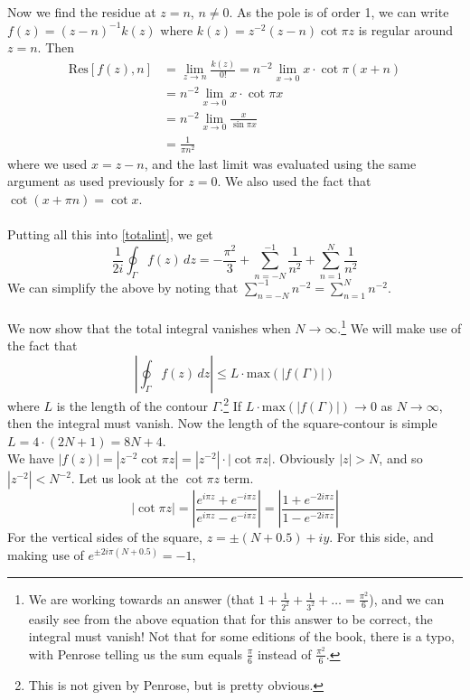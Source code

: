 Now we find the residue at $z=n$, $n\neq 0$. As the pole is of order 1, we can write $f(z)=(z-n)^{-1}k(z)$ where $k(z)=z^{-2}(z-n)\cot \pi z$ is regular around $z=n$. Then 
\begin{align*}
\text{Res}[f(z),n]&=\lim_{z\to n} \frac{k(z)}{0!}=n^{-2}\lim_{x\to 0}x\cdot\cot \pi(x+n) \\
&=n^{-2}\lim_{x\to 0}x\cdot\cot \pi x \\
&=n^{-2}\lim_{x\to 0}\frac{x}{\sin \pi x}\\
&=\frac{1}{\pi n^2}
\end{align*}
where we used $x=z-n$, and the last limit was evaluated using the same argument as used previously for $z=0$. We also used the fact that $\cot(x+\pi n)=\cot x$.\\ \\
Putting all this into \eqref{totalint}, we get
\begin{equation}\label{doubletrouble}
\frac{1}{2 i}\oint_\Gamma f(z)\, dz=-\frac{\pi^2}{3}+\sum^{-1}_{n=-N}\frac{1}{ n^2}+\sum^{N}_{n=1}\frac{1}{ n^2}\end{equation}
We can simplify the above by noting that $\sum^{-1}_{n=-N}n^{-2}=\sum^{N}_{n=1}n^{-2}$.\\ \\ We now show that the total integral vanishes when $N\to\infty$.\footnote{We are working towards an answer (that $1+\frac{1}{2^2}+\frac{1}{3^2}+\ldots=\frac{\pi^2}{6}$), and we can easily see from the above equation that for this answer to be correct, the integral must vanish! Not that for some editions of the book, there is a typo, with Penrose telling us the sum equals $\frac{\pi}{6}$ instead of $\frac{\pi^2}{6}$. } We will make use of the fact that 
$$\left|\oint_\Gamma f(z)\, dz\right|\leq L\cdot \text{max}(|f(\Gamma)|)$$
where $L$ is the length of the contour $\Gamma$.\footnote{This is not given by Penrose, but is pretty obvious.} If $L\cdot \text{max}(|f(\Gamma)|)\to 0$ as $N\to\infty$, then the integral must vanish. Now the length of the square-contour is simple $L=4\cdot (2N+1)=8N+4$. \\
We have $|f(z)|=|z^{-2}\cot \pi z|=|z^{-2}|\cdot|\cot \pi z|$. Obviously $|z|>N$, and so $|z^{-2}|<N^{-2}$. Let us look at the $\cot\pi z$ term. 
\begin{equation*}
|\cot \pi z|=\left|\frac{e^{i\pi z}+e^{-i\pi z}}{e^{i\pi z}-e^{-i\pi z}}\right|=\left|\frac{1+e^{-2i\pi z}}{1-e^{-2i\pi z}}\right|
\end{equation*}
For the vertical sides of the square, $z=\pm(N+0.5)+iy$. For this side, and making use of $e^{\pm 2i\pi(N+0.5)}=-1$,

